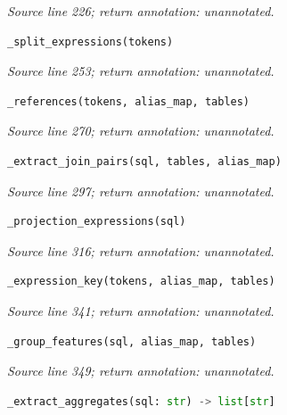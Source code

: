 {\small \textit{Source line 226; return annotation: unannotated.}}



\begin{lstlisting}[language=Python]
_split_expressions(tokens)
\end{lstlisting}


{\small \textit{Source line 253; return annotation: unannotated.}}



\begin{lstlisting}[language=Python]
_references(tokens, alias_map, tables)
\end{lstlisting}


{\small \textit{Source line 270; return annotation: unannotated.}}



\begin{lstlisting}[language=Python]
_extract_join_pairs(sql, tables, alias_map)
\end{lstlisting}


{\small \textit{Source line 297; return annotation: unannotated.}}



\begin{lstlisting}[language=Python]
_projection_expressions(sql)
\end{lstlisting}


{\small \textit{Source line 316; return annotation: unannotated.}}



\begin{lstlisting}[language=Python]
_expression_key(tokens, alias_map, tables)
\end{lstlisting}


{\small \textit{Source line 341; return annotation: unannotated.}}



\begin{lstlisting}[language=Python]
_group_features(sql, alias_map, tables)
\end{lstlisting}


{\small \textit{Source line 349; return annotation: unannotated.}}



\begin{lstlisting}[language=Python]
_extract_aggregates(sql: str) -> list[str]
\end{lstlisting}


